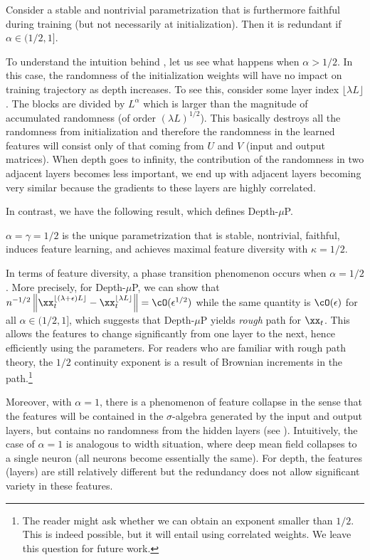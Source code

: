 \begin{claim}\label{clm:redundant}
    Consider a stable and nontrivial parametrization that is furthermore faithful during training (but not necessarily at initialization).
    Then it is redundant if $\alpha \in (1/2, 1]$.
\end{claim}
To understand the intuition behind , let us see what happens when $\alpha > 1/2$. In this case, the randomness of the initialization weights will have no impact on training trajectory as depth increases. To see this, consider some layer index $\lfloor \lambda L\rfloor$. The blocks are divided by $L^{\alpha}$ which is larger than the magnitude of accumulated randomness (of order $(\lambda L)^{1/2}$). This basically destroys all the randomness from initialization and therefore the randomness in the learned features will consist only of that coming from $U$ and $V$ (input and output matrices). When depth goes to infinity, the contribution of the randomness in two adjacent layers becomes less important, we end up with adjacent layers becoming very similar because the gradients to these layers are highly correlated. 

In contrast, we have the following result, which defines Depth-$\mu$P.

\begin{claim}[Depth-$\mu$P]\label{clm:depth_mup}
    $\alpha = \gamma = 1/2$ is the unique parametrization that is stable, nontrivial, faithful, induces feature learning, and achieves maximal feature diversity with $\kappa =1/2$.
\end{claim}

In terms of feature diversity, a phase transition phenomenon occurs when $\alpha = 1/2$. More precisely, for Depth-$\mu$P, we can show that $n^{-1/2} \left\| {\xx^{\lfloor (\lambda + \epsilon) L \rfloor}_t - \xx_t^{\lfloor \lambda L \rfloor}} \right\| = \cO(\epsilon^{1/2})$ while the same quantity is $\cO(\epsilon)$ for all $\alpha \in (1/2,1]$, which suggests that Depth-$\mu$P yields \emph{rough} path for $\xx_t$. This allows the features to change significantly from one layer to the next, hence efficiently using the parameters. For readers who are familiar with rough path theory, the $1/2$ continuity exponent is a result of Brownian increments in the path.\footnote{The reader might ask whether we can obtain an exponent smaller than $1/2$. This is indeed possible, but it will entail using correlated weights. We leave this question for future work.}

Moreover, with $\alpha = 1$, there is a phenomenon of feature collapse in the sense that the features will be contained in the $\sigma$-algebra generated by the input and output layers, but contains no randomness from the hidden layers (see ). Intuitively, the case of $\alpha=1$ is analogous to width situation, where deep mean field collapses to a
single neuron (all neurons become essentially the same). For depth, the features (layers) are still relatively different but the redundancy does not allow significant variety in these features.

